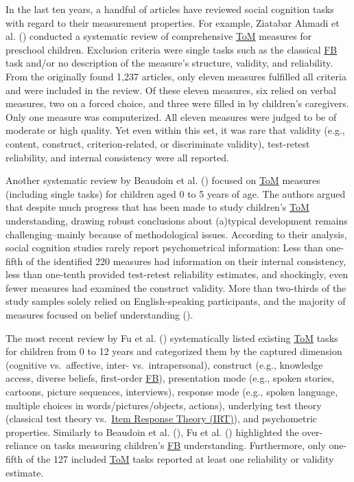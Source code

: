 \documentclass[
]{scrbook}
\begin{document}
In the last ten years, a handful of articles have reviewed social cognition tasks with regard to their measurement properties. For example, Ziatabar Ahmadi et al. () conducted a systematic review of comprehensive \hyperref[acronyms_ToM]{ToM} measures for preschool children. Exclusion criteria were single tasks such as the classical \hyperref[acronyms_FB]{FB} task and/or no description of the measure's structure, validity, and reliability. From the originally found 1,237 articles, only eleven measures fulfilled all criteria and were included in the review. Of these eleven measures, six relied on verbal measures, two on a forced choice, and three were filled in by children's caregivers. Only one measure was computerized. All eleven measures were judged to be of moderate or high quality. Yet even within this set, it was rare that validity (e.g., content, construct, criterion-related, or discriminate validity), test-retest reliability, and internal consistency were all reported.

Another systematic review by Beaudoin et al. () focused on \hyperref[acronyms_ToM]{ToM} measures (including single tasks) for children aged 0 to 5 years of age. The authors argued that despite much progress that has been made to study children's \hyperref[acronyms_ToM]{ToM} understanding, drawing robust conclusions about (a)typical development remains challenging\thinspace --\thinspace mainly because of methodological issues. According to their analysis, social cognition studies rarely report psychometrical information: Less than one-fifth of the identified 220 measures had information on their internal consistency, less than one-tenth provided test-retest reliability estimates, and shockingly, even fewer measures had examined the construct validity. More than two-thirds of the study samples solely relied on English-speaking participants, and the majority of measures focused on belief understanding ().

The most recent review by Fu et al. () systematically listed existing \hyperref[acronyms_ToM]{ToM} tasks for children from 0 to 12 years and categorized them by the captured dimension (cognitive vs.~affective, inter- vs.~intrapersonal), construct (e.g., knowledge access, diverse beliefs, first-order \hyperref[acronyms_FB]{FB}), presentation mode (e.g., spoken stories, cartoons, picture sequences, interviews), response mode (e.g., spoken language, multiple choices in words/pictures/objects, actions), underlying test theory (classical test theory vs.~\hyperref[acronyms_IRT]{Item Response Theory (IRT)}), and psychometric properties. Similarly to Beaudoin et al. (), Fu et al. () highlighted the over-reliance on tasks measuring children's \hyperref[acronyms_FB]{FB} understanding. Furthermore, only one-fifth of the 127 included \hyperref[acronyms_ToM]{ToM} tasks reported at least one reliability or validity estimate.
\end{document}
